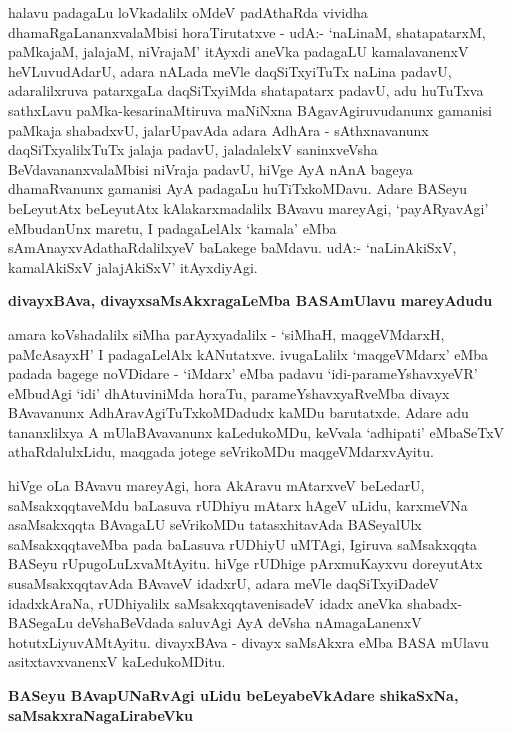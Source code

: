 halavu padagaLu loVkadalilx oMdeV padAthaRda vividha dhamaRgaLananxvalaMbisi horaTirutatxve - udA:- `naLinaM, shatapatarxM, paMkajaM, jalajaM, niVrajaM' itAyxdi aneVka padagaLU kamalavanenxV heVLuvudAdarU, adara nALada meVle daqSiTxyiTuTx naLina padavU, adaralilxruva patarxgaLa daqSiTxyiMda shatapatarx padavU, adu huTuTxva sathxLavu paMka-kesarinaMtiruva maNiNxna BAgavAgiruvudanunx gamanisi paMkaja shabadxvU, jalarUpavAda adara AdhAra - sAthxnavanunx daqSiTxyalilxTuTx jalaja padavU, jaladalelxV saninxveVsha BeVdavananxvalaMbisi niVraja padavU, hiVge AyA nAnA bageya dhamaRvanunx gamanisi AyA padagaLu huTiTxkoMDavu. Adare BASeyu beLeyutAtx beLeyutAtx kAlakarxmadalilx BAvavu mareyAgi, `payARyavAgi' eMbudanUnx maretu, I padagaLelAlx `kamala' eMba sAmAnayxvAdathaRdalilxyeV baLakege baMdavu. udA:- `naLinAkiSxV, kamalAkiSxV jalajAkiSxV' itAyxdiyAgi.

\noindent
\textbf{divayxBAva, divayxsaMsAkxragaLeMba BASAmUlavu mareyAdudu}\label{page15}

amara koVshadalilx siMha parAyxyadalilx - `siMhaH, maqgeVMdarxH, paMcAsayxH' I padagaLelAlx kANutatxve. ivugaLalilx `maqgeVMdarx' eMba padada bagege noVDidare - `iMdarx' eMba padavu `idi-parameYshavxyeVR' eMbudAgi `idi' dhAtuviniMda horaTu, parameYshavxyaRveMba divayx BAvavanunx AdhAravAgiTuTxkoMDadudx kaMDu barutatxde. Adare adu tananxlilxya A mUlaBAvavanunx kaLedukoMDu, keVvala `adhipati' eMbaSeTxV athaRdalulxLidu, maqgada jotege seVrikoMDu maqgeVMdarxvAyitu.

hiVge oLa BAvavu mareyAgi, hora AkAravu mAtarxveV beLedarU, saMsakxqqtaveMdu baLasuva rUDhiyu mAtarx hAgeV uLidu, karxmeVNa asaMsakxqqta BAvagaLU seVrikoMDu tatasxhitavAda BASeyalUlx saMsakxqqtaveMba pada baLasuva rUDhiyU uMTAgi, Igiruva saMsakxqqta BASeyu rUpugoLuLxvaMtAyitu. hiVge rUDhige pArxmuKayxvu doreyutAtx susaMsakxqqtavAda BAvaveV idadxrU, adara meVle daqSiTxyiDadeV idadxkAraNa, rUDhiyalilx saMsakxqqtavenisadeV idadx aneVka shabadx-BASegaLu deVshaBeVdada saluvAgi AyA deVsha nAmagaLanenxV hotutxLiyuvAMtAyitu. divayxBAva - divayx saMsAkxra eMba BASA mUlavu asitxtavxvanenxV kaLedukoMDitu.

\noindent
\textbf{BASeyu BAvapUNaRvAgi uLidu beLeyabeVkAdare shikaSxNa, saMsakxraNagaLirabeVku}\label{page16}

